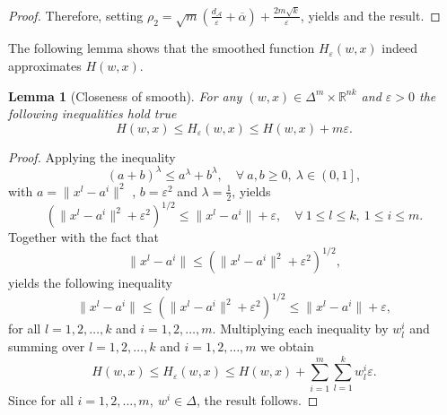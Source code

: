 \documentclass[11pt]{article}
\numberwithin{equation}{section}
\newtheorem{lemma}{Lemma}[proposition]
\begin{document}
\begin{proof}
Therefore, setting $\rho_2 = \sqrt{m} \left( \frac{d_{\mathcal{A}}}{\varepsilon} + \overline{\alpha} \right) + \frac{2m\sqrt{k}}{\varepsilon}$, yields and the result.
\end{proof}

The following lemma shows that the smoothed function $H_{\varepsilon}(w,x)$ indeed approximates $H(w,x)$.

\begin{lemma}[Closeness of smooth]
For any $(w,x) \in {\Delta}^m \times \mathbb{R}^{nk}$ and $\varepsilon > 0$ the following inequalities hold true
\begin{equation*}
	H(w,x) \leq H_{\varepsilon}(w,x) \leq H(w,x) + m\varepsilon .
\end{equation*}
\end{lemma}

\begin{proof}
Applying the inequality
\begin{equation*}
	\left( a+b \right)^{\lambda} \leq a^{\lambda} + b^{\lambda}, \quad \forall \: a,b \geq 0, \: \lambda \in \left( 0,1 \right] ,
\end{equation*}
with $a = \|x^l - a^i \|^2$ , $b = {\varepsilon}^2$ and $\lambda = \frac{1}{2}$, yields
\begin{equation*}
	\left(\|x^l - a^i \|^2 + {\varepsilon}^2 \right)^{1/2} \leq \|x^l - a^i \| + \varepsilon , \quad \forall \: 1 \leq l \leq k, \: 1 \leq i \leq m .
\end{equation*}
Together with the fact that
\begin{equation*}
	\|x^l - a^i \| \leq \left(\|x^l - a^i \|^2 + {\varepsilon}^2 \right)^{1/2},
\end{equation*}
yields the following inequality
\begin{equation*}
	\|x^l - a^i \| \leq \left(\|x^l - a^i \|^2 + {\varepsilon}^2 \right)^{1/2} \leq \|x^l - a^i \| + \varepsilon ,
\end{equation*}
for all $l=1,2, \ldots, k$ and $i=1,2, \ldots, m$.
Multiplying each inequality by $w^i_l$ and summing over $l=1,2, \ldots, k$ and $i=1,2, \ldots, m$ we obtain
\begin{equation*}
	H(w,x) \leq H_{\varepsilon}(w,x) \leq H(w,x) + \sum\limits_{i=1}^m \sum\limits_{l=1}^k w^i_l \varepsilon .
\end{equation*}
Since for all $i=1,2, \dots, m, \: w^i \in \Delta$, the result follows.
\end{proof}
\end{document}
